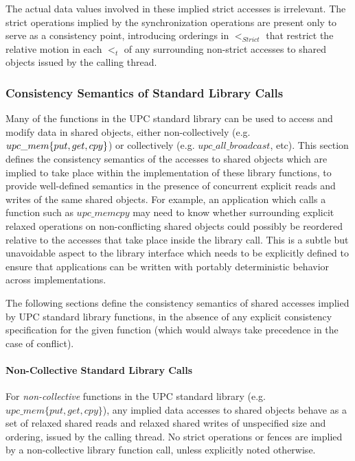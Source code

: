 \np The actual data values involved in these implied strict accesses
is irrelevant.  The strict operations implied by the synchronization operations 
are present only to serve as a consistency point, introducing orderings in 
$<_{Strict}$ that restrict the relative motion in each $<_t$ of any
surrounding non-strict accesses to shared objects issued by the calling thread.

\subsubsection{Consistency Semantics of Standard Library Calls}

\npf Many of the functions in the UPC standard library can be used to 
access and modify data in shared objects, either non-collectively 
(e.g. $upc\_mem\-\{put,get,cpy\}$) or collectively (e.g. $upc\_all\_broadcast$, etc).
This section defines the consistency semantics of the accesses 
to shared objects which are implied to take place within the 
implementation of these library functions, to provide well-defined
semantics in the presence of concurrent explicit reads and writes of the same shared objects.
For example, an application which calls a function such as $upc\_memcpy$ 
may need to know whether surrounding explicit relaxed operations on
non-conflicting shared objects could possibly be reordered relative to the
accesses that take place inside the library call.  This is a subtle but
unavoidable aspect to the library interface which needs to be explicitly
defined to ensure that applications can be written with portably deterministic
behavior across implementations. 

\np The following sections define the consistency semantics of shared accesses
implied by UPC standard library functions, in the absence of any explicit
consistency specification for the given function (which would always take
precedence in the case of conflict).

\paragraph{Non-Collective Standard Library Calls}

\npf  For {\it non-collective} functions in the UPC standard library (e.g. $upc\_mem\{put,get,cpy\}$),
any implied data accesses to shared objects behave as a set of relaxed shared
reads and relaxed shared writes of unspecified size and ordering, issued by the
calling thread. No strict operations or fences are implied by a non-collective
library function call, unless explicitly noted otherwise.


